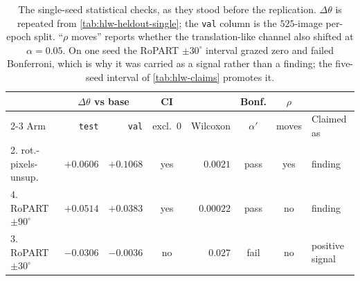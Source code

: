 \documentclass[final_report.tex]{subfiles}
\begin{document}
\begin{table}[htbp]
  \centering
  \caption[What each single-seed comparison supported]{The single-seed statistical checks, as
  they stood before the replication. $\Delta\theta$ is repeated from
  \cref{tab:hlw-heldout-single}; the \texttt{val} column is the $525$-image per-epoch split.
  ``$\rho$ moves'' reports whether the translation-like channel also shifted at
  $\alpha = 0.05$. On one seed the RoPART $\pm 30^\circ$ interval grazed zero and failed
  Bonferroni, which is why it was carried as a signal rather than a finding; the five-seed
  interval of \cref{tab:hlw-claims} promotes it.}
  \label{tab:hlw-claims-single}
  \footnotesize
  \begin{tabular}{@{}l r r c r c c l@{}}
    \toprule
    & \multicolumn{2}{c}{$\Delta\theta$ vs base} & CI & & Bonf. & $\rho$ & \\
    \cmidrule(lr){2-3}
    Arm & \texttt{test} & \texttt{val} & excl.\ 0 & Wilcoxon & $\alpha'$ & moves & Claimed as \\
    \midrule
    2. rot.-pixels-unsup.
      & $+0.0606$ & $+0.1068$ & yes & $0.0021$   & pass & yes  & finding \\
    4. RoPART $\pm 90^\circ$
      & $+0.0514$ & $+0.0383$ & yes & $0.00022$  & pass & no   & finding \\
    3. RoPART $\pm 30^\circ$
      & $-0.0306$ & $-0.0036$ & no  & $0.027$    & fail & no   & positive signal \\
    \bottomrule
  \end{tabular}
\end{table}
\end{document}
